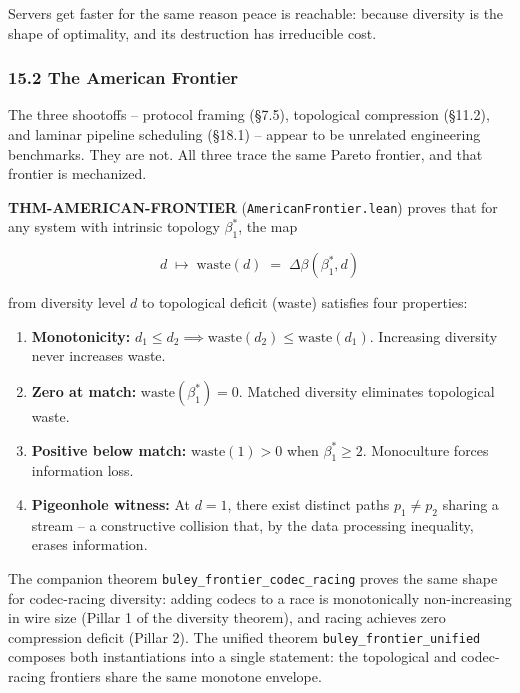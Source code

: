\documentclass[
  11pt,
]{article}
\begin{document}
Servers get faster for the same reason peace is reachable: because
diversity is the shape of optimality, and its destruction has
irreducible cost.

\subsubsection{15.2 The American Frontier}\label{the-american-frontier}

The three shootoffs -- protocol framing (§7.5), topological compression
(§11.2), and laminar pipeline scheduling (§18.1) -- appear to be
unrelated engineering benchmarks. They are not. All three trace the same
Pareto frontier, and that frontier is mechanized.

\textbf{THM-AMERICAN-FRONTIER} (\texttt{AmericanFrontier.lean}) proves
that for any system with intrinsic topology \(\beta_1^*\), the map

\[
d \;\mapsto\; \text{waste}(d) \;=\; \Delta\beta(\beta_1^*, d)
\]

from diversity level \(d\) to topological deficit (waste) satisfies four
properties:

\begin{enumerate}
\def\labelenumi{\arabic{enumi}.}
\item
  \textbf{Monotonicity:}
  \(d_1 \leq d_2 \implies \text{waste}(d_2) \leq \text{waste}(d_1)\).
  Increasing diversity never increases waste.
\item
  \textbf{Zero at match:} \(\text{waste}(\beta_1^*) = 0\). Matched
  diversity eliminates topological waste.
\item
  \textbf{Positive below match:} \(\text{waste}(1) > 0\) when
  \(\beta_1^* \geq 2\). Monoculture forces information loss.
\item
  \textbf{Pigeonhole witness:} At \(d = 1\), there exist distinct paths
  \(p_1 \neq p_2\) sharing a stream -- a constructive collision that, by
  the data processing inequality, erases information.
\end{enumerate}

The companion theorem \texttt{buley\_frontier\_codec\_racing} proves the
same shape for codec-racing diversity: adding codecs to a race is
monotonically non-increasing in wire size (Pillar 1 of the diversity
theorem), and racing achieves zero compression deficit (Pillar 2). The
unified theorem \texttt{buley\_frontier\_unified} composes both
instantiations into a single statement: the topological and codec-racing
frontiers share the same monotone envelope.
\end{document}
